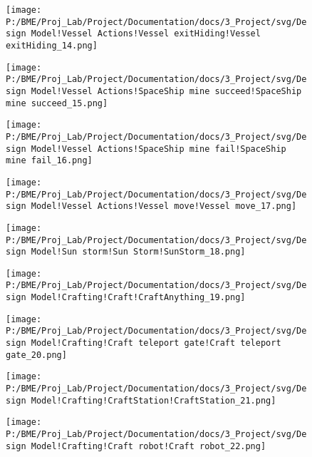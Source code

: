 \begin{figure}[H] 
\centering 
\texttt{[image: P:/BME/Proj\_Lab/Project/Documentation/docs/3\_Project/svg/Design Model!Vessel Actions!Vessel exitHiding!Vessel exitHiding\_14.png]} 
\end{figure} 

\begin{figure}[H] 
\centering 
\texttt{[image: P:/BME/Proj\_Lab/Project/Documentation/docs/3\_Project/svg/Design Model!Vessel Actions!SpaceShip mine succeed!SpaceShip mine succeed\_15.png]} 
\end{figure} 

\begin{figure}[H] 
\centering 
\texttt{[image: P:/BME/Proj\_Lab/Project/Documentation/docs/3\_Project/svg/Design Model!Vessel Actions!SpaceShip mine fail!SpaceShip mine fail\_16.png]} 
\end{figure} 

\begin{figure}[H] 
\centering 
\texttt{[image: P:/BME/Proj\_Lab/Project/Documentation/docs/3\_Project/svg/Design Model!Vessel Actions!Vessel move!Vessel move\_17.png]} 
\end{figure} 

\begin{figure}[H] 
\centering 
\texttt{[image: P:/BME/Proj\_Lab/Project/Documentation/docs/3\_Project/svg/Design Model!Sun storm!Sun Storm!SunStorm\_18.png]} 
\end{figure} 

\begin{figure}[H] 
\centering 
\texttt{[image: P:/BME/Proj\_Lab/Project/Documentation/docs/3\_Project/svg/Design Model!Crafting!Craft!CraftAnything\_19.png]} 
\end{figure} 

\begin{figure}[H] 
\centering 
\texttt{[image: P:/BME/Proj\_Lab/Project/Documentation/docs/3\_Project/svg/Design Model!Crafting!Craft teleport gate!Craft teleport gate\_20.png]} 
\end{figure} 

\begin{figure}[H] 
\centering 
\texttt{[image: P:/BME/Proj\_Lab/Project/Documentation/docs/3\_Project/svg/Design Model!Crafting!CraftStation!CraftStation\_21.png]} 
\end{figure} 

\begin{figure}[H] 
\centering 
\texttt{[image: P:/BME/Proj\_Lab/Project/Documentation/docs/3\_Project/svg/Design Model!Crafting!Craft robot!Craft robot\_22.png]} 
\end{figure} 

